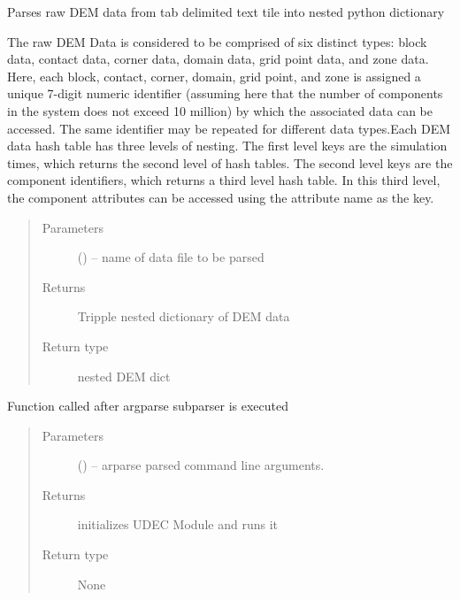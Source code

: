 \documentclass[letterpaper,10pt,english]{sphinxmanual}
\begin{document}
\begin{fulllineitems}
\label{\detokenize{MouseReferenceManual:Modules.Module_UDEC.parseDataFile}}
Parses raw DEM data from tab delimited text tile into nested python dictionary

The raw DEM Data is considered to be comprised of six distinct types: block data, contact data, corner data, domain data, grid point data, and zone data. Here, each block, contact, corner, domain, grid point, and zone is assigned a unique 7-digit numeric identifier (assuming here that the number of components in the system does not exceed 10 million) by which the associated data can be accessed. The same identifier may be repeated for different data types.Each DEM data hash table has three levels of nesting. The first level keys are the simulation times, which returns the second level of hash tables. The second level keys are the component identifiers, which returns a third level hash table. In this third level, the component attributes can be accessed using the attribute name as the key.
\begin{quote}\begin{description}
\item[{Parameters}] \leavevmode
{} () -- name of data file to be parsed

\item[{Returns}] \leavevmode
Tripple nested dictionary of DEM data

\item[{Return type}] \leavevmode
nested DEM dict

\end{description}\end{quote}

\end{fulllineitems}


\begin{fulllineitems}
\label{\detokenize{MouseReferenceManual:Modules.Module_UDEC.parserHandler}}
Function called after argparse subparser is executed
\begin{quote}\begin{description}
\item[{Parameters}] \leavevmode
{} () -- arparse parsed command line arguments.

\item[{Returns}] \leavevmode
initializes UDEC Module and runs it

\item[{Return type}] \leavevmode
None

\end{description}\end{quote}

\end{fulllineitems}
\end{document}
